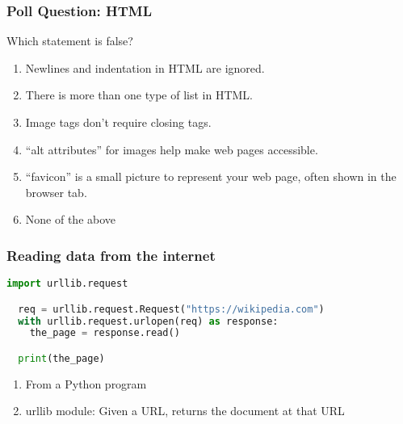\documentclass{beamer}
\begin{document}
%
%
\begin{frame}[fragile]
  \frametitle{Poll Question: HTML}
  Which statement is false?
  \begin{enumerate}[A]
    \item Newlines and indentation in HTML are ignored.
    \item There is more than one type of list in HTML.
    \item Image tags don't require closing tags.
    \item ``alt attributes'' for images help make web pages accessible.
    \item ``favicon'' is a small picture to represent your web page, often shown in the browser tab.
    \item None of the above
  \end{enumerate}
\end{frame}



%
%
\begin{frame}[fragile]
  \frametitle{Reading data from the internet}
  \begin{lstlisting}[language=Python]
  import urllib.request

  req = urllib.request.Request("https://wikipedia.com")
  with urllib.request.urlopen(req) as response:
    the_page = response.read()

  print(the_page)
  \end{lstlisting} 
  \vfill
  \begin{enumerate}[A]
    \item From a Python program
    \item urllib module: Given a URL, returns the document at that URL
  \end{enumerate}
\end{frame}
\end{document}
